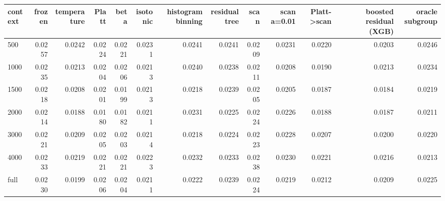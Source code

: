 \begin{tabular}{lrrrrrrrrrrrr}
\toprule
context & frozen & temperature & Platt & beta & isotonic & histogram binning & residual tree & scan & scan a=0.01 & Platt->scan & boosted residual (XGB) & oracle subgroup \\
\midrule
500 & 0.0257 & 0.0242 & 0.0224 & 0.0221 & 0.0231 & 0.0241 & 0.0241 & 0.0209 & 0.0231 & 0.0220 & 0.0203 & 0.0246 \\
1000 & 0.0235 & 0.0213 & 0.0204 & 0.0206 & 0.0213 & 0.0240 & 0.0238 & 0.0211 & 0.0208 & 0.0190 & 0.0213 & 0.0234 \\
1500 & 0.0218 & 0.0208 & 0.0201 & 0.0199 & 0.0213 & 0.0218 & 0.0239 & 0.0205 & 0.0205 & 0.0187 & 0.0184 & 0.0219 \\
2000 & 0.0214 & 0.0188 & 0.0180 & 0.0182 & 0.0211 & 0.0231 & 0.0225 & 0.0224 & 0.0226 & 0.0188 & 0.0187 & 0.0211 \\
3000 & 0.0221 & 0.0209 & 0.0205 & 0.0203 & 0.0214 & 0.0218 & 0.0224 & 0.0223 & 0.0228 & 0.0207 & 0.0200 & 0.0220 \\
4000 & 0.0233 & 0.0219 & 0.0221 & 0.0221 & 0.0223 & 0.0232 & 0.0233 & 0.0238 & 0.0230 & 0.0221 & 0.0216 & 0.0213 \\
full & 0.0230 & 0.0199 & 0.0206 & 0.0204 & 0.0211 & 0.0222 & 0.0239 & 0.0224 & 0.0219 & 0.0212 & 0.0209 & 0.0225 \\
\bottomrule
\end{tabular}
